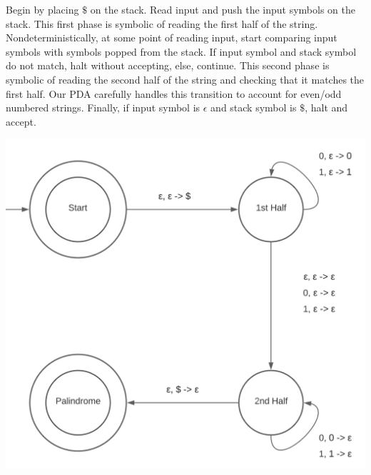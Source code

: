 \documentclass{article}
\begin{document}

Begin by placing $\$$ on the stack. Read input and push the input symbols on the stack. This first phase is symbolic of reading the first half of the string. Nondeterministically, at some point of reading input, start comparing input symbols with symbols popped from the stack. If input symbol and stack symbol do not match, halt without accepting, else, continue. This second phase is symbolic of reading the second half of the string and checking that it matches the first half. Our PDA carefully handles this transition to account for even/odd numbered strings. Finally, if input symbol is $\epsilon$ and stack symbol is $\$$, halt and accept. 

\includegraphics[scale=.65]{25e.png}
\end{document}
